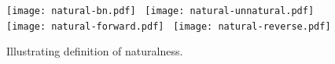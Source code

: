 \begin{wrapfigure}[15]{r}{0.25\textwidth}
  \centering\vspace*{-4pt}
  {\texttt{[image: natural-bn.pdf]}}
  \,
  {\texttt{[image: natural-unnatural.pdf]}}
  \vspace{4pt}
  {\texttt{[image: natural-forward.pdf]}}
	\,
  {\texttt{[image: natural-reverse.pdf]}}
  \vspace*{-1.2ex}
	\caption[Illustrating naturalness]{Illustrating definition of naturalness.
	\label{fig:natural-graphs}}
\end{wrapfigure}